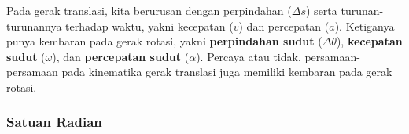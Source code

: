 \documentclass[12pt, a4paper]{article}\usepackage[utf8]{inputenc}
\theoremstyle{definition}
\theoremstyle{definition}
\begin{document}
Pada gerak translasi, kita berurusan dengan perpindahan ($\Delta s$) serta turunan-turunannya terhadap waktu, yakni kecepatan ($v$) dan percepatan ($a$). Ketiganya punya kembaran pada gerak rotasi, yakni \textbf{perpindahan sudut} ($\Delta \theta$), \textbf{kecepatan sudut} ($\omega$), dan \textbf{percepatan sudut} ($\alpha$). Percaya atau tidak, persamaan-persamaan pada kinematika gerak translasi juga memiliki kembaran pada gerak rotasi.
\par

\subsubsection{Satuan Radian}

\begin{center}

\begin{tikzpicture}[x=0.75pt,y=0.75pt,yscale=-1,xscale=1]
	

\end{tikzpicture}
\end{center}
\end{document}
